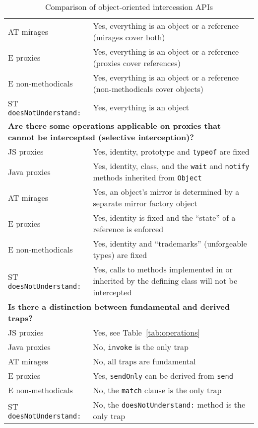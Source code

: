 \documentclass{acm_proc_article-sp}
\begin{document}
\begin{table*}
\begin{tabular}{|p{}|p{}|}
    AT mirages        & Yes, everything is an object or a reference (mirages cover both)\\
    E proxies         & Yes, everything is an object or a reference (proxies cover references)\\
    E non-methodicals & Yes, everything is an object or a reference (non-methodicals cover objects)\\
    ST \texttt{doesNotUnderstand:}  & Yes, everything is an object\\
    \hline
    \multicolumn{2}{|l|}{\textbf{Are there some operations applicable on proxies that cannot be intercepted (selective interception)?}}\\
    \hline
    JS proxies        & Yes, identity, prototype and \texttt{typeof} are fixed\\
    Java proxies      & Yes, identity, class, and the \texttt{wait} and \texttt{notify} methods inherited from \texttt{Object}\\
    AT mirages        & Yes, an object's mirror is determined by a separate mirror factory object\\
    E proxies         & Yes, identity is fixed and the ``state'' of a reference is enforced\\
    E non-methodicals & Yes, identity and ``trademarks'' (unforgeable types) are fixed\\
    ST \texttt{doesNotUnderstand:}  & Yes, calls to methods implemented in or inherited by the defining class will not be intercepted\\
    \hline
    \multicolumn{2}{|l|}{\textbf{Is there a distinction between fundamental and derived traps?}}\\
    \hline
    JS proxies        & Yes, see Table~\ref{tab:operations}\\
    Java proxies      & No, \texttt{invoke} is the only trap\\
    AT mirages        & No, all traps are fundamental\\
    E proxies         & Yes, \texttt{sendOnly} can be derived from \texttt{send}\\
    E non-methodicals & No, the \texttt{match} clause is the only trap\\
    ST \texttt{doesNotUnderstand:}  & No, the \texttt{doesNotUnderstand:} method is the only trap\\
    \hline
  \end{tabular}
  \caption{Comparison of object-oriented intercession APIs}
  \label{tab:related_work}
\end{table*}
\end{document}
